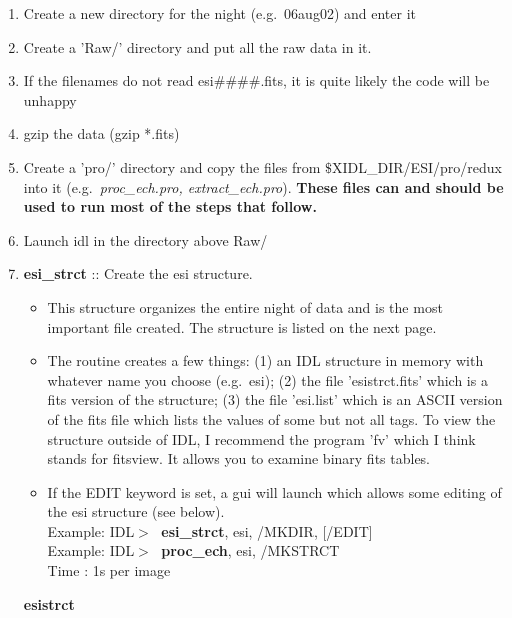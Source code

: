 \documentclass[11pt,letterpaper,dvips]{article}
\begin{document}
\begin{enumerate}
  \begin{enumerate}

    \item Create a new directory for the night (e.g.\ 06aug02) and enter it
    \item Create a 'Raw/' directory and put all the raw data in it.  
    \item If the filenames do not read esi\#\#\#\#.fits, it is quite likely
	the code will be unhappy
    \item gzip the data (gzip *.fits)
    \item Create a 'pro/' directory and copy the files from 
	$\$$XIDL\_DIR/ESI/pro/redux into it 
	(e.g.\ {\it proc\_ech.pro, extract\_ech.pro}).
	{\bf These files can and should be used to run most of the steps that follow.}
    \item Launch idl in the directory above Raw/ 
    \item {\bf esi\_strct} :: Create the esi structure.  
	\begin{itemize}
	\item This structure organizes
	the entire night of data and is the most important file created.  The 
	structure is listed on the next page.  
	\item The routine creates a few things: (1) an IDL structure in memory with
	whatever name you choose (e.g.\ esi); 
	(2) the file 'esistrct.fits' which is a fits
	version of the structure; (3) the file 'esi.list' which is an ASCII
	version of the fits file which lists the values of some but not all tags.
	To view the structure outside of IDL, I 
	recommend the program 'fv' which I think stands for fitsview.  It allows
	you to examine binary fits tables.  
	\item If the EDIT keyword is set, a
	gui will launch which allows some editing of the esi structure 
	(see below). \\
         \quad Example: IDL$> \;$ {\bf esi\_strct}, esi, /MKDIR, [/EDIT] \\  
         \quad Example: IDL$> \;$ {\bf proc\_ech}, esi, /MKSTRCT \\  
         \quad Time   : 1s per image
	\end{itemize}

	\begin{center}
	{\Large {\bf esistrct}}
	\end{center}


\end{enumerate}
\end{enumerate}
\end{document}
